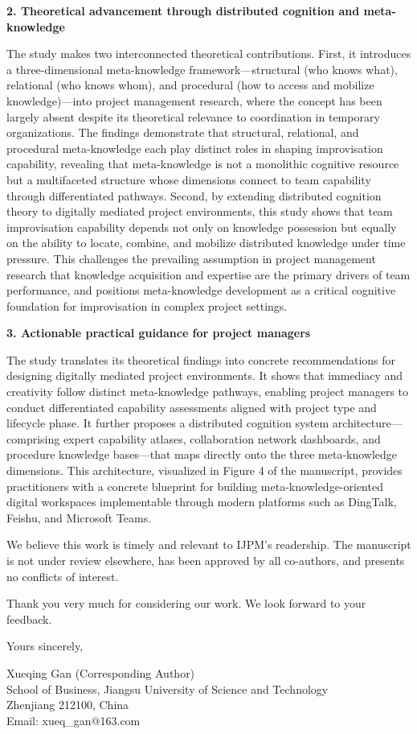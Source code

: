 \documentclass[12pt]{article}
\begin{document}
\textbf{2. Theoretical advancement through distributed cognition and meta-knowledge}

The study makes two interconnected theoretical contributions. First, it introduces a three-dimensional meta-knowledge framework---structural (who knows what), relational (who knows whom), and procedural (how to access and mobilize knowledge)---into project management research, where the concept has been largely absent despite its theoretical relevance to coordination in temporary organizations. The findings demonstrate that structural, relational, and procedural meta-knowledge each play distinct roles in shaping improvisation capability, revealing that meta-knowledge is not a monolithic cognitive resource but a multifaceted structure whose dimensions connect to team capability through differentiated pathways. Second, by extending distributed cognition theory to digitally mediated project environments, this study shows that team improvisation capability depends not only on knowledge possession but equally on the ability to locate, combine, and mobilize distributed knowledge under time pressure. This challenges the prevailing assumption in project management research that knowledge acquisition and expertise are the primary drivers of team performance, and positions meta-knowledge development as a critical cognitive foundation for improvisation in complex project settings.

\textbf{3. Actionable practical guidance for project managers}

The study translates its theoretical findings into concrete recommendations for designing digitally mediated project environments. It shows that immediacy and creativity follow distinct meta-knowledge pathways, enabling project managers to conduct differentiated capability assessments aligned with project type and lifecycle phase. It further proposes a distributed cognition system architecture---comprising expert capability atlases, collaboration network dashboards, and procedure knowledge bases---that maps directly onto the three meta-knowledge dimensions. This architecture, visualized in Figure 4 of the manuscript, provides practitioners with a concrete blueprint for building meta-knowledge-oriented digital workspaces implementable through modern platforms such as DingTalk, Feishu, and Microsoft Teams.

We believe this work is timely and relevant to IJPM's readership. The manuscript is not under review elsewhere, has been approved by all co-authors, and presents no conflicts of interest.

Thank you very much for considering our work. We look forward to your feedback.

Yours sincerely,

Xueqing Gan (Corresponding Author)\\
School of Business, Jiangsu University of Science and Technology\\
Zhenjiang 212100, China\\
Email: xueq\_gan@163.com
\end{document}

